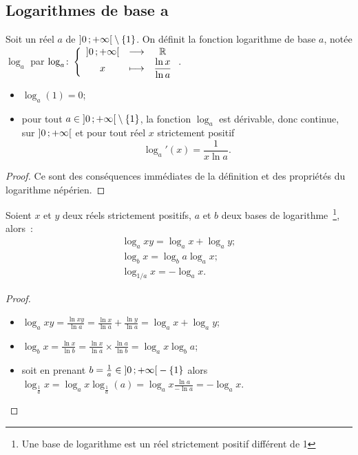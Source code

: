 \subsection{Logarithmes de base a}
\label{subsec:chap1-loga}
\begin{defdef}
  Soit un réel \(a\) de \(\left] 0 \, ;  +\infty \right[\setminus\{1\}\). On définit la fonction logarithme de base  \(a\), notée \(\log_a\) par \(\log_a\colon \left\{\begin{array}{ccc} \left] 0 \, ;  +\infty \right[ & \longrightarrow &\mathbb{R}\\ x & \longmapsto & \dfrac{\ln x}{\ln a} \end{array} \right.\).
\end{defdef}
%
\begin{prop}
  \begin{itemize}
  \item \(\log_a(1)=0\);
  \item pour tout \(a \in\left] 0 \, ;  +\infty \right[\setminus\{1\}\), la fonction \(\log_a\) est dérivable, donc continue, sur \(\left] 0 \, ;  +\infty \right[\) et pour tout réel \(x\) strictement positif
    \begin{equation}
      \log_a'(x)=\frac{1}{x \ln a}.
    \end{equation}
  \end{itemize}
\end{prop}
\begin{proof}
  Ce sont des conséquences immédiates de la définition et des propriétés du logarithme népérien.
\end{proof}
%
\begin{prop}
  Soient \(x\) et \(y\) deux réels strictement positifs, \(a\) et \(b\) deux bases de logarithme~\footnote{Une base de logarithme est un réel strictement positif différent de 1}, alors~:
  \begin{gather}
    \log_a xy=\log_a x + \log_a y; \\
    \log_b x=\log_ba \log_ax; \\
    \log_{1/a} x=-\log_a x.
  \end{gather}
\end{prop}
\begin{proof}
  \begin{itemize}
  \item \(\log_a xy= \frac{\ln xy}{\ln a}= \frac{\ln x}{\ln a} +\frac{\ln y}{\ln a}=\log_ax+\log_ay\);
  \item \(\log_b x = \frac{\ln x}{\ln b}=\frac{\ln x}{\ln a} \times \frac{\ln a}{\ln b}=\log_ax \log_ba\);
  \item soit en prenant \(b=\frac{1}{a} \in \left] 0 \, ;  +\infty \right[-\{1\}\) alors \(\log_{\frac{1}{a}}x=\log_ax \log_{\frac{1}{a}}(a)=\log_ax \frac{\ln a}{-\ln a}=-\log_ax\).
  \end{itemize}
\end{proof}
